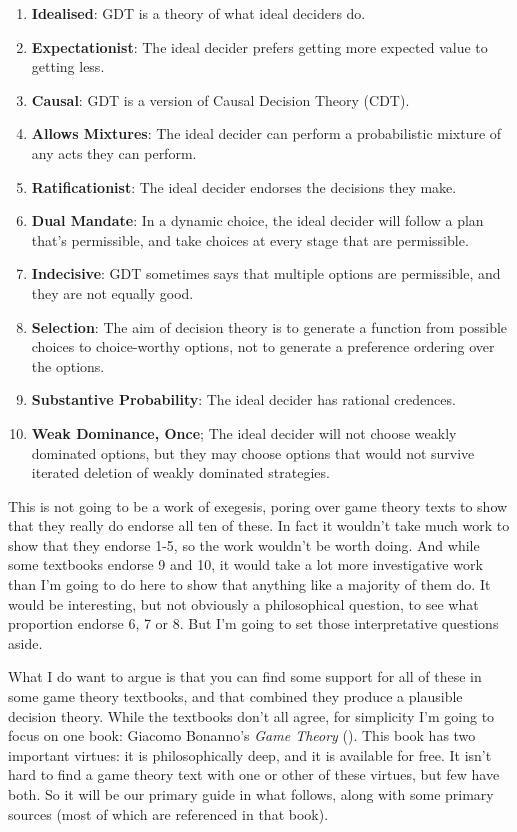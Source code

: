 \documentclass[
  12pt,
  letterpaper,
  DIV=11,
  numbers=noendperiod]{scrreprt}
\providecommand{\tightlist}{%
  \setlength{\itemsep}{0pt}\setlength{\parskip}{0pt}}\usepackage{longtable,booktabs,array}
\begin{document}
\begin{enumerate}
\def\labelenumi{\arabic{enumi}.}
\tightlist
\item
  \textbf{Idealised}: GDT is a theory of what ideal deciders do.
\item
  \textbf{Expectationist}: The ideal decider prefers getting more
  expected value to getting less.
\item
  \textbf{Causal}: GDT is a version of Causal Decision Theory (CDT).
\item
  \textbf{Allows Mixtures}: The ideal decider can perform a
  probabilistic mixture of any acts they can perform.
\item
  \textbf{Ratificationist}: The ideal decider endorses the decisions
  they make.
\item
  \textbf{Dual Mandate}: In a dynamic choice, the ideal decider will
  follow a plan that's permissible, and take choices at every stage that
  are permissible.
\item
  \textbf{Indecisive}: GDT sometimes says that multiple options are
  permissible, and they are not equally good.
\item
  \textbf{Selection}: The aim of decision theory is to generate a
  function from possible choices to choice-worthy options, not to
  generate a preference ordering over the options.
\item
  \textbf{Substantive Probability}: The ideal decider has rational
  credences.
\item
  \textbf{Weak Dominance, Once}; The ideal decider will not choose
  weakly dominated options, but they may choose options that would not
  survive iterated deletion of weakly dominated strategies.
\end{enumerate}

This is not going to be a work of exegesis, poring over game theory
texts to show that they really do endorse all ten of these. In fact it
wouldn't take much work to show that they endorse 1-5, so the work
wouldn't be worth doing. And while some textbooks endorse 9 and 10, it
would take a lot more investigative work than I'm going to do here to
show that anything like a majority of them do. It would be interesting,
but not obviously a philosophical question, to see what proportion
endorse 6, 7 or 8. But I'm going to set those interpretative questions
aside.

What I do want to argue is that you can find some support for all of
these in some game theory textbooks, and that combined they produce a
plausible decision theory. While the textbooks don't all agree, for
simplicity I'm going to focus on one book: Giacomo Bonanno's \emph{Game
Theory} (). This book has two
important virtues: it is philosophically deep, and it is available for
free. It isn't hard to find a game theory text with one or other of
these virtues, but few have both. So it will be our primary guide in
what follows, along with some primary sources (most of which are
referenced in that book).
\end{document}
